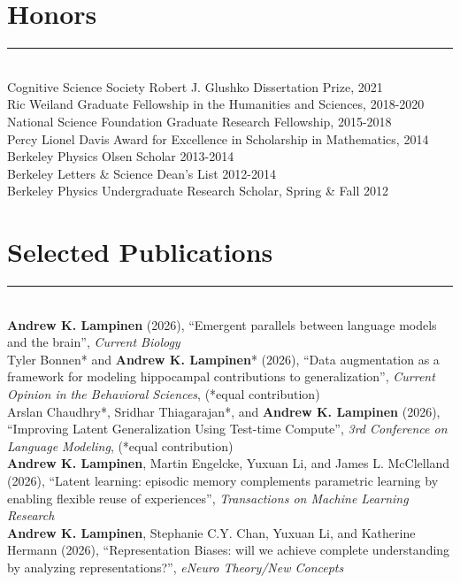 \documentclass[margin]{res}
\begin{document}
\begin{resume}
\section{Honors} \vspace{-15pt} \rule{\textwidth}{0.5pt} \\[3pt]
Cognitive Science Society Robert J. Glushko Dissertation Prize, 2021 \\
Ric Weiland Graduate Fellowship in the Humanities and Sciences, 2018-2020 \\
National Science Foundation Graduate Research Fellowship, 2015-2018 \\
Percy Lionel Davis Award for Excellence in Scholarship in Mathematics, 2014 \\ 
Berkeley Physics Olsen Scholar 2013-2014 \\
Berkeley Letters \& Science Dean's List 2012-2014\\
Berkeley Physics Undergraduate Research Scholar, Spring \& Fall 2012
\vspace{1pt}\section{Selected Publications} \vspace{-15pt} \rule{\textwidth}{0.5pt} \\[3pt]
\textbf{Andrew K. Lampinen} (2026), {``Emergent parallels between language models and the brain'',} \textit{Current Biology} \\[5pt]
Tyler Bonnen* and \textbf{Andrew K. Lampinen}* (2026), {``Data augmentation as a framework for modeling hippocampal contributions to generalization'',} \textit{Current Opinion in the Behavioral Sciences}, (*equal contribution)\\[5pt]
Arslan Chaudhry*, Sridhar Thiagarajan*, and \textbf{Andrew K. Lampinen} (2026), {``Improving Latent Generalization Using Test-time Compute''}, \textit{3rd Conference on Language Modeling}, (*equal contribution)\\[5pt]
\textbf{Andrew K. Lampinen}, Martin Engelcke, Yuxuan Li, and James L. McClelland (2026), {``Latent learning: episodic memory complements parametric learning by enabling flexible reuse of experiences''}, \textit{Transactions on Machine Learning Research}\\[5pt]
\textbf{Andrew K. Lampinen}, Stephanie C.Y. Chan, Yuxuan Li, and Katherine Hermann (2026), {``Representation Biases: will we achieve complete understanding by analyzing representations?''}, \textit{eNeuro Theory/New Concepts}\\[5pt]

\end{resume}
\end{document}
